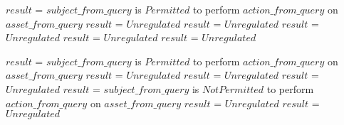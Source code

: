  
\begin{algorithm}      
\label{inclusivePS}   
\begin{algorithmic}        
              \STATE $result$ = $subject\_from\_query$ is $Permitted$ to perform $action\_from\_query$ on $asset\_from\_query$
            \ELSE
              \STATE $result$ = $Unregulated$
            \ENDIF            
          \ELSE
             \STATE $result$ = $Unregulated$
          \ENDIF
        \ELSE
          \STATE $result$ = $Unregulated$
        \ENDIF
      \ELSE
           \STATE $result$ = $Unregulated$
      \ENDIF
    \ELSE
      \STATE $result$ = $Unregulated$
    \ENDIF
\end{algorithmic}
\end{algorithm}


\begin{algorithm}      
\label{exclusivePS}   
\begin{algorithmic}        
              \STATE $result$ = $subject\_from\_query$ is $Permitted$ to perform $action\_from\_query$ on $asset\_from\_query$
            \ELSE
              \STATE $result$ = $Unregulated$
            \ENDIF            
          \ELSE
             \STATE $result$ = $Unregulated$
          \ENDIF
        \ELSE
          \STATE $result$ = $Unregulated$
        \ENDIF
      \ELSE
              \STATE $result$ = $subject\_from\_query$ is $NotPermitted$ to perform $action\_from\_query$ on $asset\_from\_query$
            \ELSE
              \STATE $result$ = $Unregulated$
            \ENDIF
      \ENDIF
    \ELSE
      \STATE $result$ = $Unregulated$
    \ENDIF
\end{algorithmic}
\end{algorithm}


